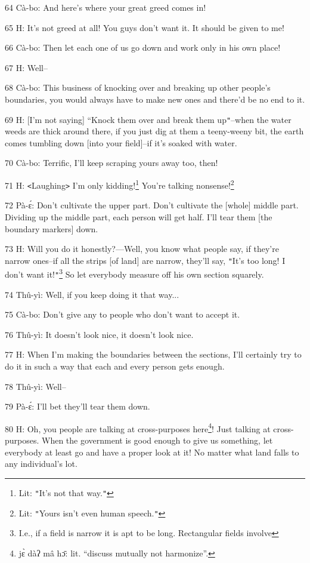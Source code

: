 {64 Cà-bo: And here's where your great greed comes in!

65 H: It's not greed at all! You guys don't want it. It should be given to me!

66 Cà-bo: Then let each one of us go down and work only in his own place!

67 H: Well--

68 Cà-bo: This business of knocking over and breaking up other people's boundaries,
you would always have to make new ones and there'd be no end to it.

69 H: [I'm not saying] ``Knock them over and break them up\texttt{"}--when the
water weeds are thick around there, if you just dig at them a teeny-weeny bit,
the earth comes tumbling down [into your field]--if it's soaked with water.

70 Cà-bo: Terrific, I'll keep scraping yours away too, then!

71 H: \texttt{<}Laughing\texttt{>} I'm only kidding!\footnote{Lit: \texttt{"}It's not that way.\texttt{"}} You're talking nonsense!\footnote{Lit: \texttt{"}Yours isn't even human speech.\texttt{"}}

72 Pà-ɛ́: Don't cultivate the upper part. Don't cultivate the [whole] middle
part. Dividing up the middle part, each person will get half. I'll tear them [the
boundary markers] down.

73 H: Will you do it honestly?---Well, you know what people say, if they're narrow
ones--if all the strips [of land] are narrow, they'll say, \texttt{"}It's too long!
I don't want it!\texttt{"}\footnote{I.e., if a field is narrow it is apt to be long. Rectangular fields involve} So let everybody measure off his own section squarely.

74 Thû-yì: Well, if you keep doing it that way...

75 Cà-bo: Don't give any to people who don't want to accept it.

76 Thû-yì: It doesn't look nice, it doesn't look nice.

77 H: When I'm making the boundaries between the sections, I'll certainly try to
do it in such a way that each and every person gets enough.

78 Thû-yì: Well--

79 Pà-ɛ́: I'll bet they'll tear them down.

80 H: Oh, you people are talking at cross-purposes here\footnote{jɛ̀ dàʔ mâ hɔ̄: lit. ``discuss mutually not harmonize''.}! Just talking at cross-purposes.
When the government is good enough to give us something, let everybody at least
go and have a proper look at it! No matter what land falls to any individual's
lot.

}
